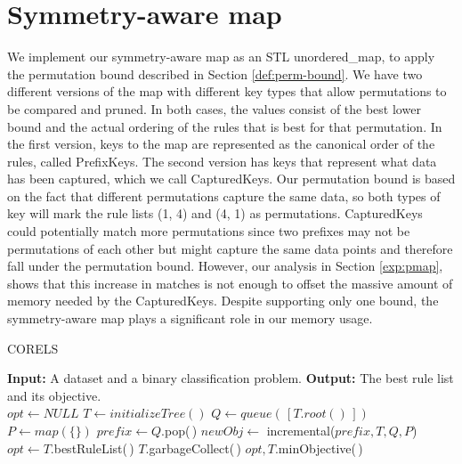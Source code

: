 \section{Symmetry-aware map}
\label{sec:pmap}
We implement our symmetry-aware map as an STL unordered\_map, to apply the permutation bound described in Section \ref{def:perm-bound}.
We have two different versions of the map with different key types that allow permutations to be compared and pruned.
In both cases, the values consist of the best lower bound and the actual ordering of the rules that is best for that permutation.
In the first version, keys to the map are represented as the canonical order of the rules, called PrefixKeys.
The second version has keys that represent what data has been captured, which we call CapturedKeys.
Our permutation bound is based on the fact that different permutations capture the same data, so both types of key will mark the rule lists (1, 4) and (4, 1) as permutations.
CapturedKeys could potentially match more permutations since two prefixes may not be permutations of each other but might capture the same data points and therefore fall under the permutation bound.
However, our analysis in Section \ref{exp:pmap}, shows that this increase in matches is not enough to offset the massive amount of memory needed by the CapturedKeys.
Despite supporting only one bound, the symmetry-aware map plays a significant role in our memory usage.

\begin{algorithm}[!t]
  \caption{CORELS}
\label{alg:corels}
\begin{algorithmic}
\normalsize
\State \textbf{Input:} A dataset and a binary classification problem.
\State \textbf{Output:} The best rule list and its objective.\\
\State $opt \gets NULL$
\State $T \gets initializeTree()$
\State $Q \gets queue(\,[T.root()\,])$
\State $P \gets map(\{\})$
	\State $prefix \gets Q$.pop(\,)
	\State $newObj \gets$ incremental($prefix, T, Q, P$) 
		\State $opt \gets T$.bestRuleList(\,)
		\State $T$.garbageCollect(\,)
	\EndIf
\EndWhile
\State \Return $opt, T$.minObjective(\,)
\end{algorithmic}
\end{algorithm}


